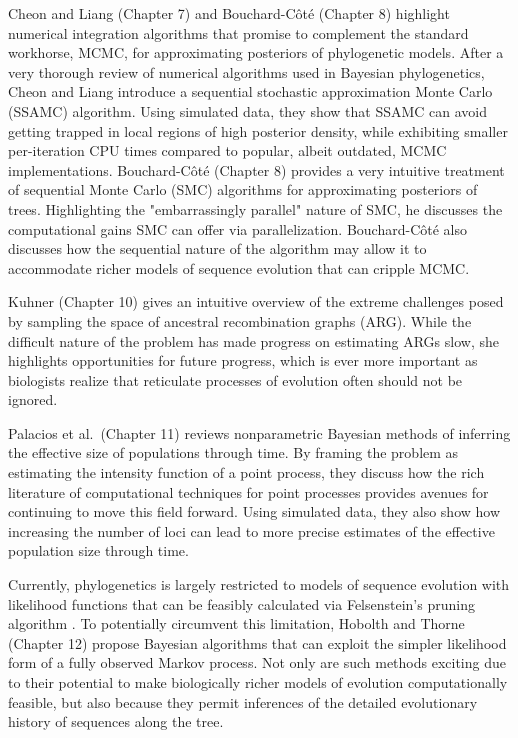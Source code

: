 \documentclass[letterpaper,12pt]{article}
\begin{document}
Cheon and Liang (Chapter 7) and Bouchard-C\^{o}t\'{e} (Chapter 8) highlight
numerical integration algorithms that promise to complement the standard
workhorse, MCMC, for approximating posteriors of phylogenetic models.
After a very thorough review of numerical algorithms used in Bayesian
phylogenetics, Cheon and Liang introduce a sequential stochastic approximation
Monte Carlo (SSAMC) \citep{Liang2007,Cheon2008} algorithm.
Using simulated data, they show that SSAMC can avoid getting trapped in local
regions of high posterior density, while exhibiting smaller per-iteration CPU
times compared to popular, albeit outdated, MCMC implementations.
Bouchard-C\^{o}t\'{e} (Chapter 8) provides a very intuitive treatment of
sequential Monte Carlo (SMC) algorithms for approximating posteriors of trees.
Highlighting the "embarrassingly parallel" nature of SMC, he discusses
the computational gains SMC can offer via parallelization.
Bouchard-C\^{o}t\'{e} also discusses how the sequential nature of the
algorithm may allow it to accommodate richer models of sequence evolution
that can cripple MCMC.

Kuhner (Chapter 10) gives an intuitive overview of the extreme challenges
posed by sampling the space of ancestral recombination graphs (ARG).
While the difficult nature of the problem has made progress on estimating
ARGs slow, she highlights opportunities for future progress, which is ever more
important as biologists realize that reticulate processes of evolution
often should not be ignored.

Palacios et al.\ (Chapter 11) reviews nonparametric Bayesian methods of
inferring the effective size of populations through time. By framing
the problem as estimating the intensity function of a point process,
they discuss how the rich literature of computational techniques
for point processes provides avenues for continuing to move
this field forward.
Using simulated data, they also show how increasing the number of loci can lead
to more precise estimates of the effective population size through time.

Currently, phylogenetics is largely restricted to models of sequence evolution
with likelihood functions that can be feasibly calculated via Felsenstein's
pruning algorithm \citep{Felsenstein1981}.
To potentially circumvent this limitation, Hobolth and Thorne (Chapter 12)
propose Bayesian algorithms that can exploit the simpler likelihood form
of a fully observed Markov process.
Not only are such methods exciting due to their potential to make biologically
richer models of evolution computationally feasible, 
but also because they permit inferences of the detailed evolutionary history
of sequences along the tree.
\end{document}
